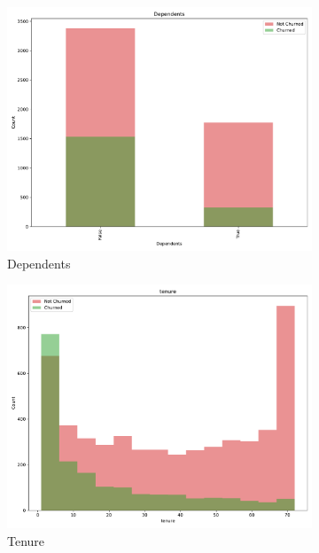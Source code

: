 \documentclass[a4paper,11pt]{article}
\begin{document}
\begin{landscape}
\begin{figure}
\begin{subfigure}{0.14\linewidth}
    \includegraphics[width=\linewidth]{figures/understanding/Dependents.pdf}
    \caption{Dependents}
\end{subfigure}
\begin{subfigure}{0.14\linewidth}
    \includegraphics[width=\linewidth]{figures/understanding/tenure.pdf}
    \caption{Tenure}
\end{subfigure}
\begin{subfigure}{0.14\linewidth}

\end{subfigure}
\end{figure}
\end{landscape}
\end{document}
